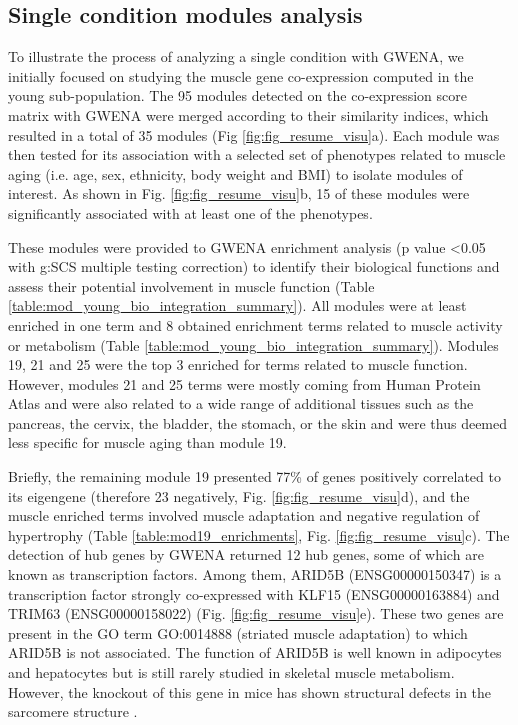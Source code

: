 \subsection{Single condition modules analysis}

To illustrate the process of analyzing a single condition with GWENA, we initially focused on studying the muscle gene co-expression computed in the young sub-population. The 95 modules detected on the co-expression score matrix with GWENA were merged according to their similarity indices, which resulted in a total of 35 modules (Fig \ref{fig:fig_resume_visu}a). Each module was then tested for its association with a selected set of phenotypes related to muscle aging (i.e. age, sex, ethnicity, body weight and BMI) to isolate modules of interest. As shown in Fig. \ref{fig:fig_resume_visu}b, 15 of these modules were significantly associated with at least one of the phenotypes.

These modules were provided to GWENA enrichment analysis (p value \textless 0.05 with g:SCS multiple testing correction) to identify their biological functions and assess their potential involvement in muscle function (Table \ref{table:mod_young_bio_integration_summary}). All modules were at least enriched in one term and 8 obtained enrichment terms related to muscle activity or metabolism (Table \ref{table:mod_young_bio_integration_summary}). Modules 19, 21 and 25 were the top 3 enriched for terms related to muscle function. However, modules 21 and 25 terms were mostly coming from Human Protein Atlas and were also related to a wide range of additional tissues such as the pancreas, the cervix, the bladder, the stomach, or the skin and were thus deemed less specific for muscle aging than module 19. 

Briefly, the remaining module 19 presented 77\% of genes positively correlated to its eigengene (therefore 23 negatively, Fig. \ref{fig:fig_resume_visu}d), and the muscle enriched terms involved muscle adaptation and negative regulation of hypertrophy (Table \ref{table:mod19_enrichments}, Fig. \ref{fig:fig_resume_visu}c). The detection of hub genes by GWENA returned 12 hub genes, some of which are known as transcription factors. Among them, ARID5B (ENSG00000150347) is a transcription factor strongly co-expressed with KLF15 (ENSG00000163884) and TRIM63 (ENSG00000158022) (Fig. \ref{fig:fig_resume_visu}e). These two genes are present in the GO term GO:0014888 (striated muscle adaptation) to which ARID5B is not associated. The function of ARID5B is well known in adipocytes and hepatocytes but is still rarely studied in skeletal muscle metabolism. However, the knockout of this gene in mice has shown structural defects in the sarcomere structure .

